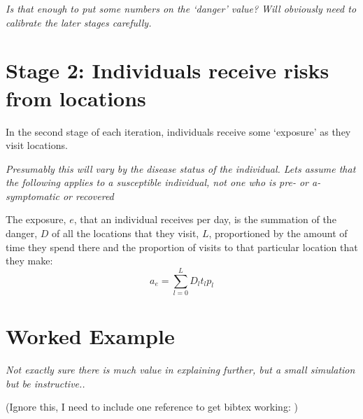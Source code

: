 \documentclass{article}
\begin{document}
\textit{Is that enough to put some numbers on the `danger' value? Will obviously need to calibrate the later stages carefully.}

\section{Stage 2: Individuals receive risks from locations}

In the second stage of each iteration, individuals receive some `exposure' as they visit locations.

\textit{Presumably this will vary by the disease status of the individual. Lets assume that the following applies to a susceptible individual, not one who is pre- or a-symptomatic or recovered}

The exposure, $e$, that an individual receives per day, is the summation of the danger, $D$ of all the locations that they visit, $L$, proportioned by the amount of time they spend there and the proportion of visits to that particular location that they make:
\begin{equation}
  a_e = \sum_{l=0}^{L} D_l t_l p_l 
\end{equation}

\section{Worked Example}

\textit{Not exactly sure there is much value in explaining further, but a small simulation but be instructive..}



\newpage
(Ignore this, I need to include one reference to get bibtex working: \cite{hellewell_feasibility_2020})



\end{document}
